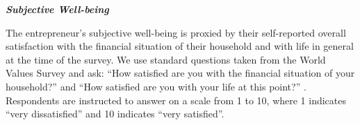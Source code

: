 \documentclass[11.5pt]{article}
\begin{document}
\textbf{\emph{Subjective Well-being}}

The entrepreneur's subjective well-being is proxied by their self-reported overall satisfaction with the financial situation of their household and with life in general at the time of the survey. We use standard questions taken from the World Values Survey and ask: ``How satisfied are you with the financial situation of your household?'' and ``How satisfied are you with your life at this point?'' \citep[see,][]{Inglehart2014}. Respondents are instructed to answer on a scale from 1 to 10, where 1 indicates ``very dissatisfied'' and 10 indicates ``very satisfied''. \\





\end{document}
